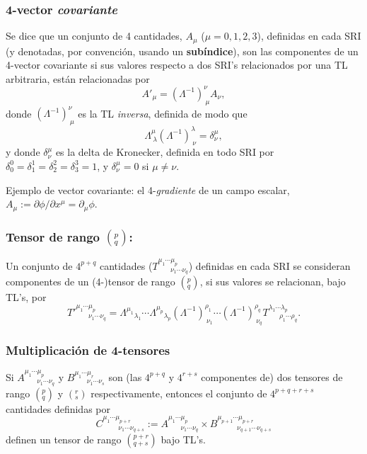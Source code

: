 \subsubsection{4-vector \textit{covariante}}
Se dice que un conjunto de 4 cantidades, $A_\mu$ ($\mu=0,1,2,3$), definidas en cada SRI (y denotadas, por convención, usando un \textbf{subíndice}), son las componentes de un 4-vector covariante si sus valores respecto a dos SRI's relacionados por una TL arbitraria, están relacionadas por
\begin{equation}
A'_\mu=\left( \Lambda^{-1}\right)^\nu _{\ \mu}A_{\nu},
\end{equation}
donde $\left( \Lambda^{-1}\right)^\nu _{\ \mu}$ es la TL \textit{inversa}, definida de modo que
\begin{equation}
\Lambda^\mu_{\ \lambda}\left( \Lambda^{-1}\right)^{\lambda}_{\
\nu}=\delta^\mu_\nu ,
\end{equation}
y donde $\delta^\mu_\nu$ es la delta de Kronecker, definida en todo SRI por 
$\delta^0_0=\delta^1_1=\delta^2_2=\delta^3_3=1$, y $\delta^\mu_\nu=0$ si
$\mu\neq\nu$. 

Ejemplo de vector covariante: el 4-\textit{gradiente} de un campo escalar, $A_\mu:={\partial\phi}/{\partial x^\mu}=\partial_\mu\phi$.

\subsubsection{Tensor de rango $(^p_q)$:}
Un conjunto de $4^{p+q}$ cantidades ($T^{\mu_1 \cdots\mu_p}_{\ \ \ \ \ \ \ \
\nu_1\cdots\nu_q}$) definidas en cada SRI se consideran componentes de un (4-)tensor de rango $(^p_q)$, si sus valores se relacionan, bajo TL's, por
\begin{equation}
T'^{\mu_1 \cdots\mu_p}_{\ \ \ \ \ \ \ \
\nu_1\cdots\nu_q}={\Lambda^{\mu_1}}_{\lambda_1} \cdots
{\Lambda^{\mu_p}}_{\lambda_p} \left( \Lambda^{-1}\right) ^{\rho_1}_{\
\nu_1}\cdots\left( \Lambda^{-1}\right) ^{\rho_q}_{\ \nu_q} T^{\lambda_1
\cdots\lambda_p}_{\ \ \ \ \ \ \ \rho_1\cdots\rho_q}. 
\end{equation}

\subsubsection{Multiplicación de 4-tensores}
 Si $A^{\mu_1 \cdots\mu_p}_{\ \ \ \ \ \ \ \
\nu_1\cdots\nu_q}$ y $B^{\mu_1 \cdots\mu_r}_{\ \ \ \ \ \ \ \
\nu_1\cdots\nu_s}$ son (las $4^{p+q}$ y $4^{r+s}$ componentes de) dos tensores de rango $(^p_q)$ y $(^r_s)$ respectivamente, entonces el
conjunto de $4^{p+q+r+s}$ cantidades definidas por
\begin{equation}
C^{\mu_1 \cdots\mu_{p+r}}_{\ \ \ \ \ \ \ \ \ \
\nu_1\cdots\nu_{q+s}}:=A^{\mu_1 \cdots\mu_p}_{\ \ \ \ \ \ \ \
\nu_1\cdots\nu_q}\times B^{\mu_{p+1} \cdots\mu_{p+r}}_{\ \ \ \ \ \ \ \ \ \ \ \ \, \nu_{q+1}\cdots\nu_{q+s}}
\end{equation}
definen un tensor de rango $(^{p+r}_{q+s})$ bajo TL's.

